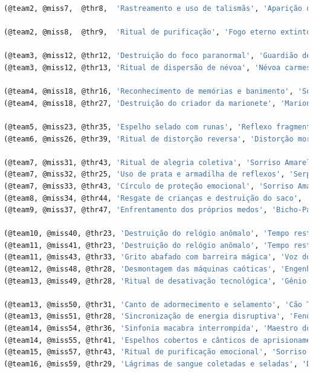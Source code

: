 \documentclass[12pt,a4paper]{report}
\begin{document}
\begin{lstlisting}[language=SQL, caption=population.sql]
(@team2, @miss7,  @thr8,  'Rastreamento e uso de talismãs', 'Aparição dissipada'),

(@team2, @miss8,  @thr9,  'Ritual de purificação', 'Fogo eterno extinto temporariamente'),

(@team3, @miss12, @thr12, 'Destruição do foco paranormal', 'Guardião de pedra adormecido'),
(@team3, @miss12, @thr13, 'Ritual de dispersão de névoa', 'Névoa carmesim dissipada'),

(@team4, @miss18, @thr16, 'Reconhecimento de memórias e banimento', 'Sombras do passado dispersas'),
(@team4, @miss18, @thr27, 'Destruição do criador da marionete', 'Marionete de carne neutralizada'),

(@team5, @miss23, @thr35, 'Espelho selado com runas', 'Reflexo fragmentado e contido'),
(@team6, @miss26, @thr39, 'Ritual de distorção reversa', 'Distorção mortal revertida'),

(@team7, @miss31, @thr43, 'Ritual de alegria coletiva', 'Sorriso Amarelo dissipado pela felicidade do grupo'),
(@team7, @miss32, @thr25, 'Uso de prata e armadilha de reflexos', 'Serpente prateada capturada'),
(@team7, @miss33, @thr43, 'Círculo de proteção emocional', 'Sorriso Amarelo disperso por empatia'),
(@team8, @miss34, @thr44, 'Resgate de crianças e destruição do saco', 'Homem do Saco dissipado'),
(@team9, @miss37, @thr47, 'Enfrentamento dos próprios medos', 'Bicho-Papão enfraquecido e disperso'),

(@team10, @miss40, @thr23, 'Destruição do relógio anômalo', 'Tempo restaurado no local'),
(@team11, @miss41, @thr23, 'Destruição do relógio anômalo', 'Tempo restaurado e anomalia temporal resolvida'),
(@team11, @miss43, @thr33, 'Grito abafado com barreira mágica', 'Voz do Vazio silenciada'),
(@team12, @miss48, @thr28, 'Desmontagem das máquinas caóticas', 'Engenheiro caótico derrotado e tecnologia desfeita'),
(@team13, @miss49, @thr28, 'Ritual de desativação tecnológica', 'Gênio insano aprisionado em circuito fechado'),

(@team13, @miss50, @thr31, 'Canto de adormecimento e selamento', 'Cão Tricéfalo adormecido e portão selado'),
(@team13, @miss51, @thr28, 'Sincronização de energia disruptiva', 'Fenômenos tecnológicos neutralizados'),
(@team14, @miss54, @thr36, 'Sinfonia macabra interrompida', 'Maestro dos Ossos disperso'),
(@team14, @miss55, @thr41, 'Espelhos cobertos e cânticos de aprisionamento', 'Menino do Espelho contido em dimensão reflexa'),
(@team15, @miss57, @thr43, 'Ritual de purificação emocional', 'Sorriso Insano dissipado'),
(@team16, @miss59, @thr29, 'Lágrimas de sangue coletadas e seladas', 'Dama das Lágrimas neutralizada'),


\end{lstlisting}
\end{document}
